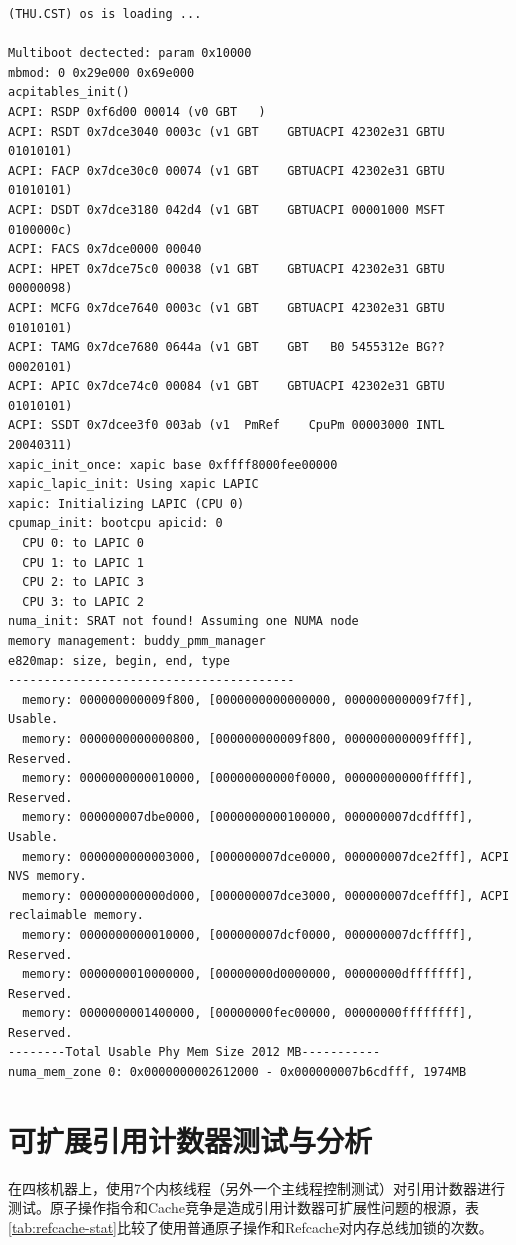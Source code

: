 {\tiny
	\begin{Verbatim}[frame=single]
(THU.CST) os is loading ...

Multiboot dectected: param 0x10000
mbmod: 0 0x29e000 0x69e000
acpitables_init()
ACPI: RSDP 0xf6d00 00014 (v0 GBT   )
ACPI: RSDT 0x7dce3040 0003c (v1 GBT    GBTUACPI 42302e31 GBTU 01010101)
ACPI: FACP 0x7dce30c0 00074 (v1 GBT    GBTUACPI 42302e31 GBTU 01010101)
ACPI: DSDT 0x7dce3180 042d4 (v1 GBT    GBTUACPI 00001000 MSFT 0100000c)
ACPI: FACS 0x7dce0000 00040
ACPI: HPET 0x7dce75c0 00038 (v1 GBT    GBTUACPI 42302e31 GBTU 00000098)
ACPI: MCFG 0x7dce7640 0003c (v1 GBT    GBTUACPI 42302e31 GBTU 01010101)
ACPI: TAMG 0x7dce7680 0644a (v1 GBT    GBT   B0 5455312e BG?? 00020101)
ACPI: APIC 0x7dce74c0 00084 (v1 GBT    GBTUACPI 42302e31 GBTU 01010101)
ACPI: SSDT 0x7dcee3f0 003ab (v1  PmRef    CpuPm 00003000 INTL 20040311)
xapic_init_once: xapic base 0xffff8000fee00000
xapic_lapic_init: Using xapic LAPIC
xapic: Initializing LAPIC (CPU 0)
cpumap_init: bootcpu apicid: 0
  CPU 0: to LAPIC 0
  CPU 1: to LAPIC 1
  CPU 2: to LAPIC 3
  CPU 3: to LAPIC 2
numa_init: SRAT not found! Assuming one NUMA node
memory management: buddy_pmm_manager
e820map: size, begin, end, type
----------------------------------------
  memory: 000000000009f800, [0000000000000000, 000000000009f7ff], Usable.
  memory: 0000000000000800, [000000000009f800, 000000000009ffff], Reserved.
  memory: 0000000000010000, [00000000000f0000, 00000000000fffff], Reserved.
  memory: 000000007dbe0000, [0000000000100000, 000000007dcdffff], Usable.
  memory: 0000000000003000, [000000007dce0000, 000000007dce2fff], ACPI NVS memory.
  memory: 000000000000d000, [000000007dce3000, 000000007dceffff], ACPI reclaimable memory.
  memory: 0000000000010000, [000000007dcf0000, 000000007dcfffff], Reserved.
  memory: 0000000010000000, [00000000d0000000, 00000000dfffffff], Reserved.
  memory: 0000000001400000, [00000000fec00000, 00000000ffffffff], Reserved.
--------Total Usable Phy Mem Size 2012 MB-----------
numa_mem_zone 0: 0x0000000002612000 - 0x000000007b6cdfff, 1974MB
	\end{Verbatim}
}

\section{可扩展引用计数器测试与分析}
在四核机器上，使用7个内核线程（另外一个主线程控制测试）对引用计数器进行测试。原子操作指令和Cache竞争是造成引用计数器可扩展性问题的根源，表\ref{tab:refcache-stat}比较了使用普通原子操作和Refcache对内存总线加锁的次数。

